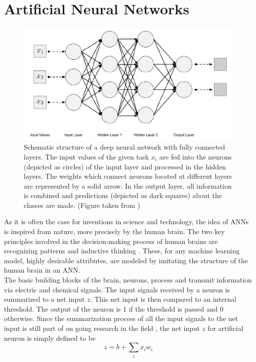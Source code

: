 \section{Artificial Neural Networks}
\label{sec:ANNs}
\begin{figure}[H]
\centering
\includegraphics[scale=0.37]{figs/NeuralNetwork.png}
\caption{Schematic structure of a deep neural network with fully connected layers. The input values of the given task $x_i$ are fed into the neurons (depicted as circles) of the input layer and processed in the hidden layers. The weights which connect neurons located at different layers are represented by a solid arrow. In the output layer, all information is combined and predictions (depicted as dark squares) about the classes are made. (Figure taken from \cite{patterson2017deep})}
\label{fig:NeuralNetwork}
\end{figure}
As it is often the case for inventions in science and technology, the idea of ANNs is inspired from nature, more precisely by the human brain. The two key principles involved in the decision-making process of human brains are recognizing patterns and inductive thinking \cite{logan2018thinking}. These, for any machine learning model, highly desirable attributes, are modeled by imitating the structure of the human brain in an ANN. \\
The basic building blocks of the brain, neurons, process and transmit information via electric and chemical signals. The input signals received by a neuron is summarized to a net input $z$. This net input is then compared to an internal threshold. The output of the neuron is 1 if the threshold is passed and 0 otherwise. Since the summarization process of all the input signals to the net input is still part of on going research in the field \cite{bioNeuron}, the net input $z$ for artificial neuron is simply defined to be
\begin{equation}
z=b + \sum_i x_i w_i
\end{equation}
